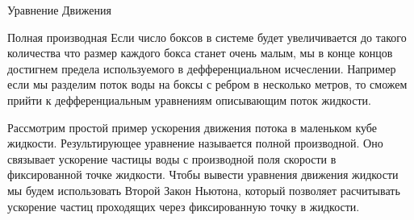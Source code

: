 \begin{chapter}{Уравнение Движения}
\begin{section}{Полная производная}
Если число боксов в системе будет увеличивается до такого количества
что размер каждого бокса станет очень малым, мы в конце концов
достигнем предела используемого в дефференциальном
исчеслении. Например если мы разделим поток воды на боксы с ребром в
несколько метров, то сможем прийти к дефференциальным уравнениям
описывающим поток жидкости.
%

Рассмотрим простой пример ускорения движения потока в маленьком кубе
жидкости. Результирующее уравнение называется полной производной. Оно
связывает ускорение частицы воды с производной поля скорости в
фиксированной точке жидкости. Чтобы вывести уравнения движения
жидкости мы будем использовать Второй Закон Ньютона, который позволяет
расчитывать ускорение частиц проходящих через фиксированную точку в
жидкости.
%



\end{section}
\end{chapter}
